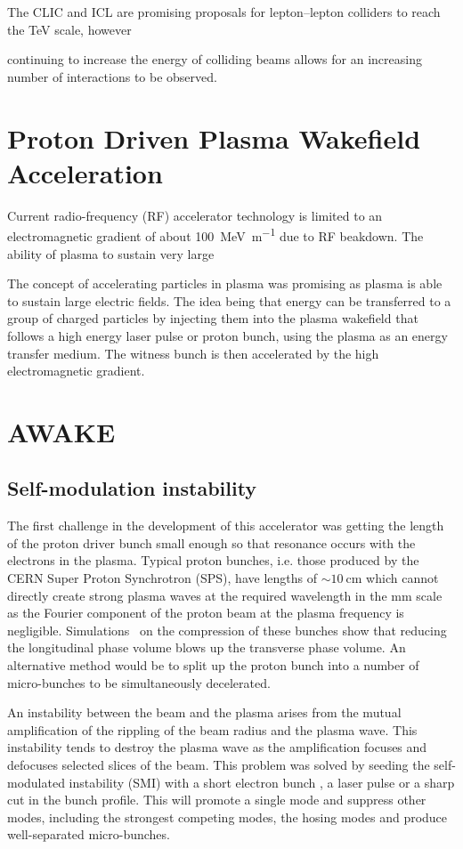The CLIC and ICL are promising proposals for lepton--lepton colliders to reach
the \si{\tera\electronvolt} scale, however

continuing to increase the energy of colliding beams allows for an increasing
number of interactions to be observed.

\section{Proton Driven Plasma Wakefield Acceleration}

Current radio-frequency (RF) accelerator technology is limited to an
electromagnetic gradient of about \SI{100}{\mega\electronvolt\per\meter} due to
RF beakdown.  The ability of plasma to sustain very large 

The concept of accelerating particles in plasma was promising as plasma is able
to sustain large electric fields.  The idea being that energy can be
transferred to a group of charged particles by injecting them into the plasma
wakefield that follows a high energy laser pulse or proton bunch, using the
plasma as an energy transfer medium.  The witness bunch is then accelerated by
the high electromagnetic gradient.

\section{AWAKE}

\subsection{Self-modulation instability}

The first challenge in the development of this accelerator was getting the
length of the proton driver bunch small enough so that resonance occurs with
the electrons in the plasma.  Typical proton bunches, i.e. those produced by
the CERN Super Proton Synchrotron (SPS), have lengths of \(\sim
\SI{10}{\centi\meter}\) which cannot directly create strong plasma waves at the
required wavelength in the \si{\milli\meter} scale as the Fourier component of
the proton beam at the plasma frequency is negligible.
Simulations~\cite{kumar2010self} on the compression of these bunches show that
reducing the longitudinal phase volume blows up the transverse phase volume.
An alternative method would be to split up the proton bunch into a number of
micro-bunches to be simultaneously decelerated.

An instability between the beam and the plasma arises from the mutual
amplification of the rippling of the beam radius and the plasma wave. This
instability tends to destroy the plasma wave as the amplification focuses and
defocuses selected slices of the beam.  This problem was solved by seeding the
self-modulated instability (SMI) with a short electron bunch
\cite{lotov2013natural}, a laser pulse \cite{siemon2013laser} or a sharp cut in
the bunch profile\cite{kumar2010self}. This will promote a single mode and
suppress other modes, including the strongest competing modes, the hosing modes
\cite{vieira2014hosing} and produce well-separated micro-bunches.

